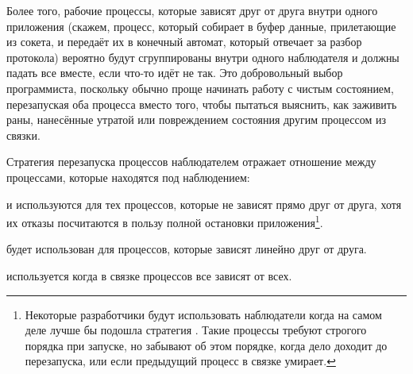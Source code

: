 \documentclass[11pt, oneside]{book}   	%
\begin{document}
Более того, рабочие процессы, которые зависят друг от друга внутри одного приложения (скажем, процесс, который собирает в буфер данные, прилетающие из сокета, и передаёт их в конечный автомат, который отвечает за разбор протокола) вероятно будут сгруппированы внутри одного наблюдателя и должны падать все вместе, если что-то идёт не так. Это добровольный выбор программиста, поскольку обычно проще начинать работу с чистым состоянием, перезапуская оба процесса вместо того, чтобы пытаться выяснить, как заживить раны, нанесённые утратой или повреждением состояния другим процессом из связки.

Стратегия перезапуска процессов наблюдателем отражает отношение между процессами, которые находятся под наблюдением:

\begin{itemize*}
	\item {} и  используются для тех процессов, которые не зависят прямо друг от друга, хотя их отказы посчитаются в пользу полной остановки приложения\footnote{Некоторые разработчики будут использовать наблюдатели  когда на самом деле лучше бы подошла стратегия . Такие процессы требуют строгого порядка при запуске, но забывают об этом порядке, когда дело доходит до перезапуска, или если предыдущий процесс в связке умирает.}.
	\item {} будет использован для процессов, которые зависят линейно друг от друга.
	\item {} используется когда в связке процессов все зависят от всех.
\end{itemize*}
\end{document}
